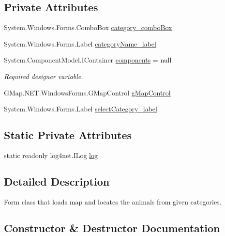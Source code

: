 \subsection*{Private Attributes}
\begin{DoxyCompactItemize}
\item 
System.\+Windows.\+Forms.\+Combo\+Box \hyperlink{classWildlifeTrackingApp_1_1LocateCategory_a8b1f399ade6c575e8562bc7d574d60d5}{category\+\_\+combo\+Box}
\item 
System.\+Windows.\+Forms.\+Label \hyperlink{classWildlifeTrackingApp_1_1LocateCategory_ad2144d281f164c5692cabbdd67e60c00}{category\+Name\+\_\+label}
\item 
System.\+Component\+Model.\+I\+Container \hyperlink{classWildlifeTrackingApp_1_1LocateCategory_a02595f1c09713bb71dcb2fbbfc7ffa4b}{components} = null
\begin{DoxyCompactList}\small\item\em Required designer variable. \end{DoxyCompactList}\item 
G\+Map.\+N\+E\+T.\+Windows\+Forms.\+G\+Map\+Control \hyperlink{classWildlifeTrackingApp_1_1LocateCategory_a33b985f58f15052a572266a4a0b43637}{g\+Map\+Control}
\item 
System.\+Windows.\+Forms.\+Label \hyperlink{classWildlifeTrackingApp_1_1LocateCategory_a2fd4190abaec4ee146747d5a024d1bda}{select\+Category\+\_\+label}
\end{DoxyCompactItemize}
\subsection*{Static Private Attributes}
\begin{DoxyCompactItemize}
\item 
static readonly log4net.\+I\+Log \hyperlink{classWildlifeTrackingApp_1_1LocateCategory_ae6c6142b8525b2f4ac6ee6e003b3106f}{log}
\end{DoxyCompactItemize}


\subsection{Detailed Description}
Form class that loads map and locates the animals from given categories. 



\subsection{Constructor \& Destructor Documentation}
\mbox{\label{classWildlifeTrackingApp_1_1LocateCategory_abdc0fce16d0e2de3af4c81225ae3c925}} 
